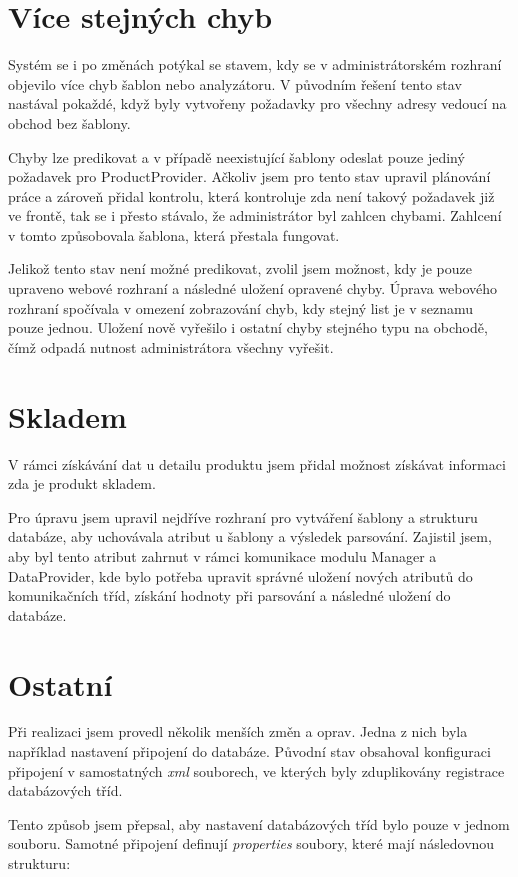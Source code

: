 \documentclass[thesis=B,czech]{FITthesis}[2012/06/26]
\begin{document}
\section{Více stejných chyb}
Systém se i po změnách potýkal se stavem, kdy se v administrátorském rozhraní objevilo více chyb šablon nebo analyzátoru.
V původním řešení tento stav nastával pokaždé, když byly vytvořeny požadavky pro všechny adresy vedoucí na obchod bez šablony.
\par
Chyby lze predikovat a v případě neexistující šablony odeslat pouze jediný požadavek pro ProductProvider. Ačkoliv jsem pro tento 
stav upravil plánování práce a zároveň přidal kontrolu, která kontroluje zda není takový požadavek již ve frontě, tak se
i přesto stávalo, že administrátor byl zahlcen chybami. Zahlcení v tomto způsobovala šablona, která přestala fungovat.
\par
Jelikož tento stav není možné predikovat, zvolil jsem možnost, kdy je pouze upraveno webové rozhraní a následné uložení opravené chyby.
Úprava webového rozhraní spočívala v omezení zobrazování chyb, kdy stejný list je v seznamu pouze jednou.  Uložení nově vyřešilo i ostatní chyby stejného typu na obchodě, čímž odpadá nutnost administrátora všechny vyřešit.

\section{Skladem}
V rámci získávání dat u detailu produktu jsem přidal možnost získávat informaci zda je produkt skladem.
\par
Pro úpravu jsem upravil nejdříve rozhraní pro vytváření šablony a strukturu databáze, aby uchovávala atribut u šablony a výsledek parsování.
Zajistil jsem, aby byl tento atribut zahrnut v rámci komunikace modulu Manager a DataProvider, kde bylo potřeba upravit
správné uložení nových atributů do komunikačních tříd, získání hodnoty při parsování a následné uložení do databáze.

\section{Ostatní}
Při realizaci jsem provedl několik menších změn a oprav. Jedna z nich byla například nastavení 
připojení do databáze. Původní stav obsahoval konfiguraci připojení v samostatných \textit{xml} souborech, ve kterých byly zduplikovány
registrace databázových tříd.
\par
Tento způsob jsem přepsal, aby nastavení databázových tříd bylo pouze v jednom souboru. Samotné připojení definují
\textit{properties} soubory, které mají následovnou strukturu:
\end{document}
